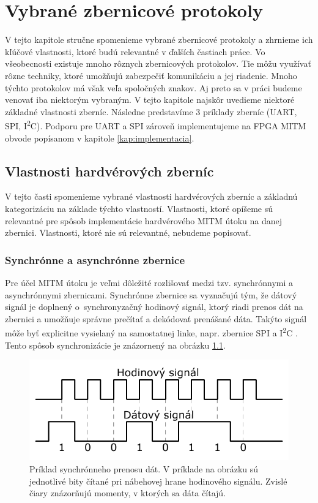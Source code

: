 \chapter{Vybrané zbernicové protokoly}
\label{kap:zbernice}

V tejto kapitole stručne spomenieme vybrané zbernicové protokoly a zhrnieme ich kľúčové vlastnosti, ktoré budú relevantné v ďalších častiach práce. Vo všeobecnosti existuje mnoho rôznych zbernicových protokolov. Tie môžu využívať rôzne techniky, ktoré umožňujú zabezpečiť komunikáciu a jej riadenie. Mnoho týchto protokolov má však veľa spoločných znakov. Aj preto sa v práci budeme venovať iba niektorým vybraným. V tejto kapitole najskôr uvedieme niektoré základné vlastnosti zberníc. Následne predstavíme 3 príklady zberníc (UART, SPI, I\textsuperscript{2}C). Podporu pre UART a SPI zároveň implementujeme na FPGA MITM obvode popísanom v kapitole \ref{kap:implementacia}.

\section{Vlastnosti hardvérových zberníc}
V tejto časti spomenieme vybrané vlastnosti hardvérových zberníc a základnú kategorizáciu na základe týchto vlastností. Vlastnosti, ktoré opíšeme sú relevantné pre spôsob implementácie hardvérového MITM útoku na danej zbernici. Vlastnosti, ktoré nie sú relevantné, nebudeme popisovať.

\subsection{Synchrónne a asynchrónne zbernice} \label{sek:syncAsync}
Pre účel MITM útoku je veľmi dôležité rozlišovať medzi tzv. synchrónnymi a asynchrónnymi zbernicami. Synchrónne zbernice sa vyznačujú tým, že dátový signál je doplnený o~synchronyzačný hodinový signál, ktorý riadi prenos dát na zbernici a umožňuje správne prečítať a dekódovať prenášané dáta. Takýto signál môže byť explicitne vysielaný na samostatnej linke, napr. zbernice SPI \cite{spiBus} a I\textsuperscript{2}C \cite{i2cSpec}. Tento spôsob synchronizácie je znázornený na obrázku \ref{obr:clockDemo}.

\begin{figure}
    \centerline{\includegraphics[width=1\textwidth]{images/signals/clockDemo.pdf}}
    \caption[Príklad synchrónneho prenosu dát]{Príklad synchrónneho prenosu dát. V príklade na obrázku sú jednotlivé bity čítané pri nábehovej hrane hodinového signálu. Zvislé čiary znázorňujú momenty, v ktorých sa dáta čítajú.}
    \label{obr:clockDemo}
\end{figure}

